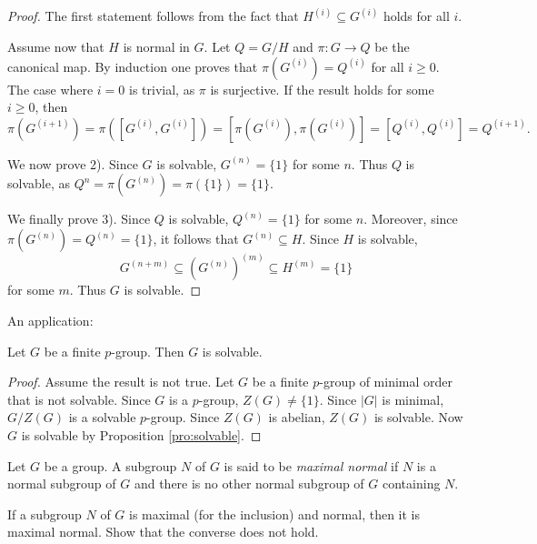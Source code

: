 \begin{proof}
    The first statement follows from the fact that
    $H^{(i)}\subseteq G^{(i)}$ holds for all $i$. 
 
    Assume now that $H$ is normal in $G$. 
    Let $Q=G/H$ and $\pi\colon G\to Q$ be the canonical map.
    By induction one proves that $\pi(G^{(i)})=Q^{(i)}$ for all $i\geq0$.
    The case where $i=0$ is trivial, as $\pi$ is surjective. 
    If the result holds for some $i\geq0$, then
    \[
            \pi(G^{(i+1)})=\pi([G^{(i)},G^{(i)}])=[\pi(G^{(i)}),\pi(G^{(i)})]=[Q^{(i)},Q^{(i)}]=Q^{(i+1)}.
    \]

    We now prove 2). Since $G$ is solvable, $G^{(n)}=\{1\}$ for some $n$. 
    Thus $Q$ is solvable, as $Q^{n}=\pi(G^{(n)})=\pi(\{1\})=\{1\}$. 

    We finally prove 3). 
    Since $Q$ is solvable, $Q^{(n)}=\{1\}$ for some $n$.
    Moreover, since $\pi(G^{(n)})=Q^{(n)}=\{1\}$, it follows that
    $G^{(n)}\subseteq H$. Since $H$
    is solvable, 
    \[
        G^{(n+m)}\subseteq (G^{(n)})^{(m)}\subseteq H^{(m)}=\{1\}
    \]
    for some $m$. Thus $G$ is solvable.
\end{proof}

An application:

\begin{proposition}
    Let $G$ be a finite $p$-group. Then $G$ is solvable. 
\end{proposition}

\begin{proof}
    Assume the result is not true. Let $G$ be a finite
    $p$-group of minimal order that is not solvable. Since 
    $G$ is a $p$-group, $Z(G)\ne\{1\}$. Since $|G|$ is minimal, 
    $G/Z(G)$ is a solvable $p$-group. Since $Z(G)$ is abelian, 
    $Z(G)$ is solvable. Now $G$ is solvable 
    by Proposition \ref{pro:solvable}.
\end{proof}

Let $G$ be a group. A subgroup $N$ of $G$ is said to be \emph{maximal normal} 
if $N$ is a normal subgroup of $G$ and there is no other normal subgroup of $G$ 
containing $N$. 

\begin{exercise}
    If a subgroup $N$ of $G$ is maximal (for the inclusion) and
    normal, then it is maximal normal. Show that the converse does not hold.
\end{exercise}


